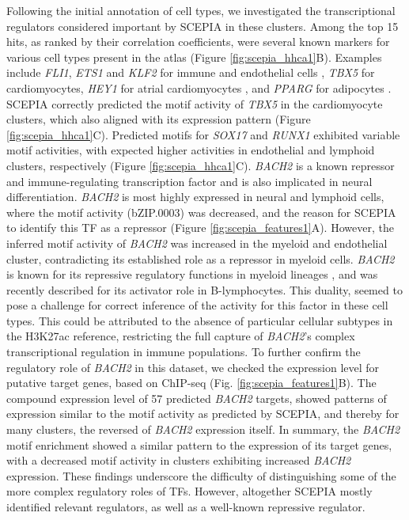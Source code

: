 Following the initial annotation of cell types, we investigated the transcriptional regulators considered important by SCEPIA in these clusters. Among the top 15 hits, as ranked by their correlation coefficients, were several known markers for various cell types present in the atlas (Figure \ref{fig:scepia_hhca1}B). Examples include \textit{FLI1}, \textit{ETS1} and \textit{KLF2} for immune and endothelial cells \cite{Meadows2009,Zhao2018,BenDavid2022}, \textit{TBX5} for cardiomyocytes\cite{Steimle2017,Siatra2023}, \textit{HEY1} for atrial cardiomyocytes \cite{Kokubo2007}, and \textit{PPARG} for adipocytes \cite{Ma2018}. SCEPIA correctly predicted the motif activity of \textit{TBX5} in the cardiomyocyte clusters, which also aligned with its expression pattern (Figure \ref{fig:scepia_hhca1}C). Predicted motifs for \textit{SOX17} and \textit{RUNX1} exhibited variable motif activities, with expected higher activities in endothelial and lymphoid clusters, respectively (Figure \ref{fig:scepia_hhca1}C)\cite{Lee2014,Schachterle2017,Sood2017}. \textit{BACH2} is a known repressor and immune-regulating transcription factor and is also implicated in neural differentiation\cite{Hoshino2002,Liu2022}. \textit{BACH2} is most highly expressed in neural and lymphoid cells, where the motif activity (bZIP.0003) was decreased, and the reason for SCEPIA to identify this TF as a repressor (Figure \ref{fig:scepia_features1}A). However, the inferred motif activity of \textit{BACH2} was increased in the myeloid and endothelial cluster, contradicting its established role as a repressor in myeloid cells. \textit{BACH2} is known for its repressive regulatory functions in myeloid lineages \cite{ItohNakadai2014}, and was recently described for its activator role in B-lymphocytes\cite{Ochiai2022}. This duality, seemed to pose a challenge for correct inference of the activity for this factor in these cell types. This could be attributed to the absence of particular cellular subtypes in the H3K27ac reference, restricting the full capture of \textit{BACH2}'s complex transcriptional regulation in immune populations. To further confirm the regulatory role of \textit{BACH2} in this dataset, we checked the expression level for putative target genes, based on ChIP-seq (Fig. \ref{fig:scepia_features1}B). The compound expression level of 57 predicted \textit{BACH2} targets, showed patterns of expression similar to the motif activity as predicted by SCEPIA, and thereby for many clusters, the reversed of \textit{BACH2} expression itself. In summary, the \textit{BACH2} motif enrichment showed a similar pattern to the expression of its target genes, with a decreased motif activity in clusters exhibiting increased \textit{BACH2} expression. These findings underscore the difficulty of distinguishing some of the more complex regulatory roles of TFs. However, altogether SCEPIA mostly identified relevant regulators, as well as a well-known repressive regulator.

